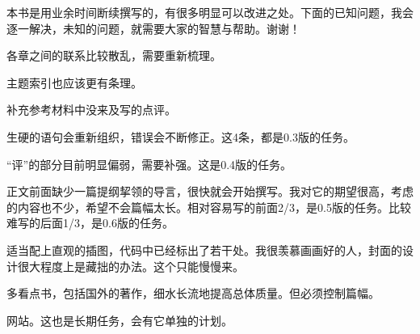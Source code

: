 本书是用业余时间断续撰写的，有很多明显可以改进之处。下面的已知问题，我会逐一解决，未知的问题，就需要大家的智慧与帮助。谢谢！
\begin{lyitemize}
\item 各章之间的联系比较散乱，需要重新梳理。
\item 主题索引也应该更有条理。
\item 补充参考材料中没来及写的点评。
\item 生硬的语句会重新组织，错误会不断修正。这4条，都是0.3版的任务。
\item “评”的部分目前明显偏弱，需要补强。这是0.4版的任务。
\item 正文前面缺少一篇提纲挈领的导言，很快就会开始撰写。我对它的期望很高，考虑的内容也不少，希望不会篇幅太长。相对容易写的前面2/3，是0.5版的任务。比较难写的后面1/3，是0.6版的任务。
\item 适当配上直观的插图，代码中已经标出了若干处。我很羡慕画画好的人，封面的设计很大程度上是藏拙的办法。这个只能慢慢来。
\item 多看点书，包括国外的著作，细水长流地提高总体质量。但必须控制篇幅。
\item 网站。这也是长期任务，会有它单独的计划。
\end{lyitemize}

